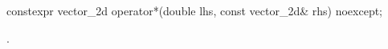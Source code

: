 \begin{itemdecl}
constexpr vector_2d operator*(double lhs, const vector_2d& rhs) noexcept;
\end{itemdecl}
\begin{itemdescr}
\pnum
\returns
{}.
\end{itemdescr}
